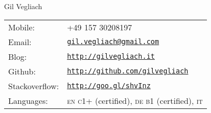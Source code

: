 \documentclass[letterpaper]{article}
\def\name{Gil Vegliach}
\begin{document}
{\huge \name}


\vspace{0.25in}

\begin{minipage}{0.45\linewidth}
  \begin{tabular}{ll}
    Mobile: & +49 157 30208197 \\
    Email: & \href{mailto:gil.vegliach@gmail.com}{\tt gil.vegliach@gmail.com} \\
    Blog: & \href{http://gilvegliach.it/}{\tt http://gilvegliach.it} \\
    Github: &\href{http://github.com/gilvegliach}{\tt http://github.com/gilvegliach}\\
    Stackoverflow: & \href{http://goo.gl/shvInz}{\tt http://goo.gl/shvInz} \\
    Languages: & \textsc{en c1+} (certified), \textsc{de b1} (certified), \textsc{it}
  \end{tabular}
\end{minipage}

\bigskip


\end{document}
